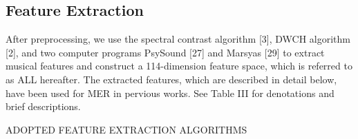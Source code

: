 \documentclass[journal, twoside]{IEEEtran}
\begin{document}
\subsection{Feature Extraction}
After preprocessing, we use the spectral contrast algorithm [3], DWCH algorithm [2], and two computer programs PsySound [27] and Marsyas [29] to extract musical features and construct a 114-dimension feature space, which is referred to as ALL hereafter. The extracted features, which are described in detail below, have been used for MER in pervious works. See Table III for denotations and brief descriptions.

\bgroup
\def\arraystretch{1.3}
\vspace{1cm}
\begin{table}[ht]
    \centering
        \caption{ADOPTED FEATURE EXTRACTION ALGORITHMS}
        \label{table3}
    

\end{table}
\end{document}
